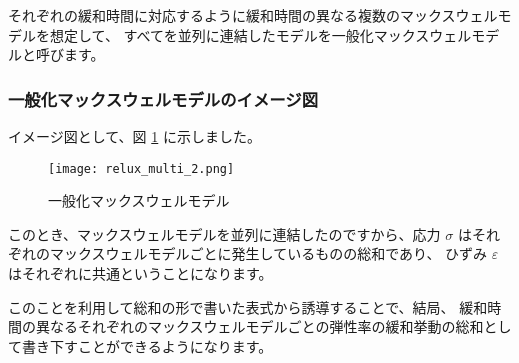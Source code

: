 \documentclass[uplatex,dvipdfmx,a4paper,11pt]{jsreport}
\begin{document}
それぞれの緩和時間に対応するように緩和時間の異なる複数のマックスウェルモデルを想定して、
すべてを並列に連結したモデルを一般化マックスウェルモデルと呼びます。

\subsubsection{一般化マックスウェルモデルのイメージ図}
イメージ図として、図 \ref{fig:gen_maxwell} に示しました。
\begin{figure}[htb]
	\begin{center}
		\begin{minipage}{0.9\textwidth}
			\begin{center}
			\texttt{[image: relux\_multi\_2.png]}
			\end{center}
		\end{minipage}
		\caption{一般化マックスウェルモデル}
		\label{fig:gen_maxwell}
	\end{center}
\end{figure}

このとき、マックスウェルモデルを並列に連結したのですから、応力 $\sigma$ はそれぞれのマックスウェルモデルごとに発生しているものの総和であり、
ひずみ $\varepsilon$ はそれぞれに共通ということになります。

このことを利用して総和の形で書いた表式から誘導することで、結局、
緩和時間の異なるそれぞれのマックスウェルモデルごとの弾性率の緩和挙動の総和として書き下すことができるようになります。
\end{document}
